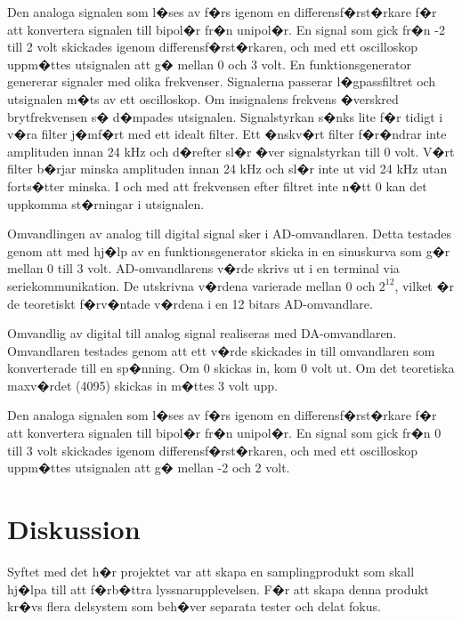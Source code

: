 \documentclass[a4paper]{article}
\begin{document}
Den analoga signalen som l�ses av f�rs igenom en differensf�rst�rkare f�r att konvertera signalen till bipol�r fr�n unipol�r. En signal som gick fr�n -2 till 2 volt skickades igenom differensf�rst�rkaren, och med ett oscilloskop uppm�ttes utsignalen att g� mellan 0 och 3 volt.
\newpage
En funktionsgenerator genererar signaler med olika frekvenser. Signalerna passerar l�gpassfiltret och utsignalen m�ts av ett oscilloskop. Om insignalens frekvens �verskred brytfrekvensen s� d�mpades utsignalen. Signalstyrkan s�nks lite f�r tidigt i v�ra filter j�mf�rt med ett idealt filter. Ett �nskv�rt filter f�r�ndrar inte amplituden innan 24 kHz och d�refter sl�r �ver signalstyrkan till 0 volt. V�rt filter b�rjar minska amplituden innan 24 kHz och sl�r inte ut vid 24 kHz utan forts�tter minska. I och med att frekvensen efter filtret inte n�tt 0 kan det uppkomma st�rningar i utsignalen.

Omvandlingen av analog till digital signal sker i AD-omvandlaren. Detta testades genom att med hj�lp av en funktionsgenerator skicka in en sinuskurva som g�r mellan 0 till 3 volt. AD-omvandlarens v�rde skrivs ut i en terminal via seriekommunikation. De utskrivna v�rdena varierade mellan 0 och $2^{12}$, vilket �r de teoretiskt f�rv�ntade v�rdena i en 12 bitars AD-omvandlare.

Omvandlig av digital till analog signal realiseras med DA-omvandlaren. Omvandlaren testades genom att ett v�rde skickades in till omvandlaren som konverterade till en sp�nning. Om 0 skickas in, kom 0 volt ut. Om det teoretiska maxv�rdet (4095) skickas in m�ttes 3 volt upp.

Den analoga signalen som l�ses av f�rs igenom en differensf�rst�rkare f�r att konvertera signalen till bipol�r fr�n unipol�r. En signal som gick fr�n 0 till 3 volt skickades igenom differensf�rst�rkaren, och med ett oscilloskop uppm�ttes utsignalen att g� mellan -2 och 2 volt.



\section{Diskussion}
Syftet med det h�r projektet var att skapa en samplingprodukt som skall hj�lpa till att f�rb�ttra lyssnarupplevelsen. F�r att skapa denna produkt kr�vs flera delsystem som beh�ver separata tester och delat fokus.  
\end{document}
